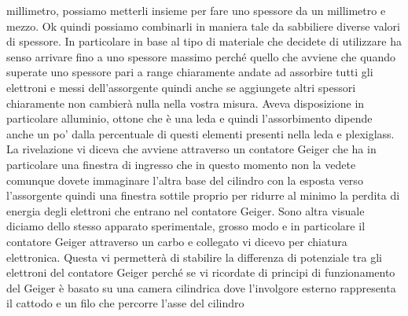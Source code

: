 millimetro, possiamo metterli insieme per fare uno spessore da un millimetro e mezzo. Ok quindi possiamo combinarli in maniera tale da sabbiliere diverse valori di spessore. In particolare in base al tipo di materiale che decidete di utilizzare ha senso arrivare fino a uno spessore massimo perché quello che avviene che quando superate uno spessore pari a range chiaramente andate ad assorbire tutti gli elettroni e messi dell'assorgente quindi anche se aggiungete altri spessori chiaramente non cambierà nulla nella vostra misura. Aveva disposizione in particolare alluminio, ottone che è una leda e quindi l'assorbimento dipende anche un po' dalla percentuale di questi elementi presenti nella leda e plexiglass. La rivelazione vi diceva che avviene attraverso un contatore Geiger che ha in particolare una finestra di ingresso che in questo momento non la vedete comunque dovete immaginare l'altra base del cilindro con la esposta verso l'assorgente quindi una finestra sottile proprio per ridurre al minimo la perdita di energia degli elettroni che entrano nel contatore Geiger. Sono altra visuale diciamo dello stesso apparato sperimentale, grosso modo e in particolare il contatore Geiger attraverso un carbo e collegato vi dicevo per chiatura elettronica. Questa vi permetterà di stabilire la differenza di potenziale tra gli elettroni del contatore Geiger perché se vi ricordate di principi di funzionamento del Geiger è basato su una camera cilindrica dove l'involgore esterno rappresenta il cattodo e un filo che percorre l'asse del cilindro 

